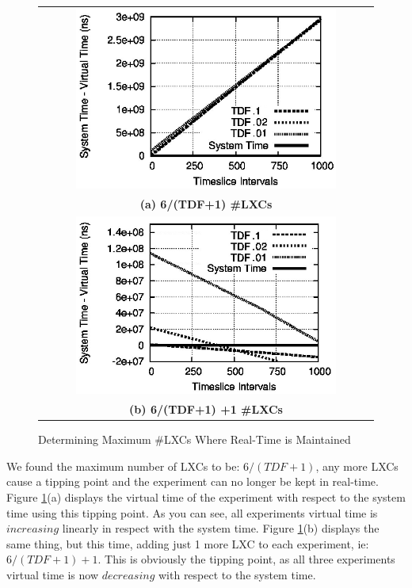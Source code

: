 \begin{figure} \centering  
 \begin{tabular}{c} 
      \includegraphics[width=0.8\textwidth]{images/optimal.eps} \\ 
      {\textbf{(a) 6/(TDF+1) \#LXCs}}\label{subfig-1:rtopt} \\ 
      \includegraphics[width=0.8\textwidth]{images/notoptimal.eps} \\ 
      {\textbf{(b) 6/(TDF+1) +1 \#LXCs}}\label{subfig-2:rtnotopt} 
  \end{tabular} 
    \caption{Determining Maximum \#LXCs Where Real-Time is Maintained} 
    \label{fig:rt} 
  \end{figure} 
We found the maximum number of LXCs to be: $6/(TDF+1)$, any more LXCs cause a tipping point and the experiment can no longer be kept in  real-time. Figure \ref{fig:rt}(a) displays the virtual time of the experiment with respect to the system time using this tipping point. As you can see, all experiments virtual time is $increasing$ linearly in respect with the system time. Figure \ref{fig:rt}(b) displays the same thing, but this time, adding just 1 more LXC to each experiment, ie: $6/(TDF+1)+1$. This is obviously the tipping point, as all three experiments virtual time is now $decreasing$ with respect to the system time.
